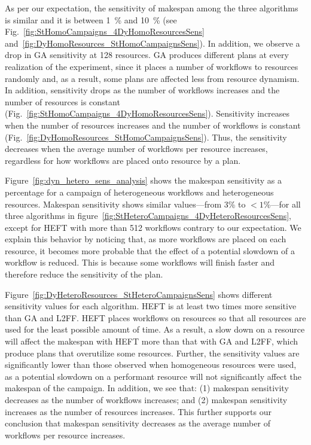 As per our expectation, the sensitivity of makespan among the three algorithms
is similar and it is between 1~\% and 10~\% (see
Fig.~\ref{fig:StHomoCampaigns_4DyHomoResourcesSens}
and~\ref{fig:DyHomoResources_StHomoCampaignsSens}). In addition, we observe a
drop in GA sensitivity at 128 resources. GA produces different plans at every
realization of the experiment, since it places a number of workflows to
resources randomly and, as a result, some plans are affected less from resource
dynamism. In addition, sensitivity drops as the number of workflows increases
and the number of resources is constant
(Fig.~\ref{fig:StHomoCampaigns_4DyHomoResourcesSens}). Sensitivity increases
when the number of resources increases and the number of workflows is constant
(Fig.~\ref{fig:DyHomoResources_StHomoCampaignsSens}). Thus, the sensitivity
decreases when the average number of workflows per resource increases,
regardless for how workflows are placed onto resource by a plan.

Figure~\ref{fig:dyn_hetero_sens_analysis} shows the makespan sensitivity as a
percentage for a campaign of heterogeneous workflows and heterogeneous
resources. Makespan sensitivity shows similar values---from 3\% to $<1$\%---for
all three algorithms in
figure~\ref{fig:StHeteroCampaigns_4DyHeteroResourcesSens}, except for HEFT with
more than 512 workflows contrary to our expectation. We explain this behavior by
noticing that, as more workflows are placed on each resource, it becomes more
probable that the effect of a potential slowdown of a workflow is reduced. This
is because some workflows will finish faster and therefore reduce the
sensitivity of the plan.

Figure~\ref{fig:DyHeteroResources_StHeteroCampaignsSens} shows different
sensitivity values for each algorithm. HEFT is at least two times more sensitive
than GA and L2FF. HEFT places workflows on resources so that all resources are
used for the least possible amount of time. As a result, a slow down on a
resource will affect the makespan with HEFT more than that with GA and L2FF,
which produce plans that overutilize some resources. Further, the sensitivity
values  are significantly lower than those observed when
homogeneous resources were used, as a potential slowdown on a performant
resource will not significantly affect the makespan of the campaign. In
addition, we see that: (1) makespan sensitivity decreases as the number of
workflows increases; and (2) makespan sensitivity increases as the number of
resources increases. This further supports our conclusion that makespan
sensitivity decreases as the average number of workflows per resource increases.

